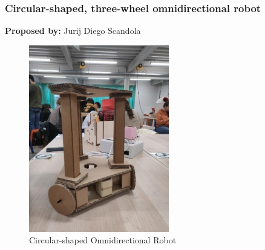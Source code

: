 \subsubsection{Circular-shaped, three-wheel omnidirectional robot}

\textbf{Proposed by:} Jurij Diego Scandola

\begin{figure}[H]
    \centering
    \includegraphics[width=0.5\linewidth]{../ReportMovementModule/images/Aspose.Words.728084da-df58-4b9d-a372-f65cffbdb23d.005.jpeg}
    \caption{Circular-shaped Omnidirectional Robot}
\end{figure}

